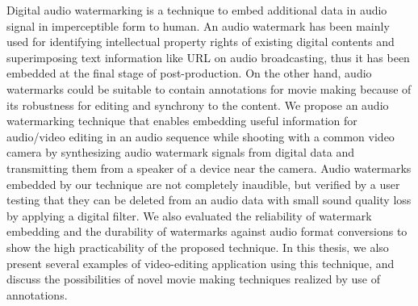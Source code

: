 \begin{eabstract}
Digital audio watermarking is a technique to embed additional data in audio signal in imperceptible form to human.
An audio watermark has been mainly used for identifying intellectual property rights of existing digital contents and superimposing text information like URL on audio broadcasting, thus it has been embedded at the final stage of post-production.
On the other hand, audio watermarks could be suitable to contain annotations for movie making because of its robustness for editing and synchrony to the content.
We propose an audio watermarking technique that enables embedding useful information for audio/video editing in an audio sequence while shooting with a common video camera by synthesizing audio watermark signals from digital data and transmitting them from a speaker of a device near the camera.
Audio watermarks embedded by our technique are not completely inaudible, but verified by a user testing that they can be deleted from an audio data with small sound quality loss by applying a digital filter.
We also evaluated the reliability of watermark embedding and the durability of watermarks against audio format conversions to show the high practicability of the proposed technique.
In this thesis, we also present several examples of video-editing application using this technique, and discuss the possibilities of novel movie making techniques realized by use of annotations.
\end{eabstract}
